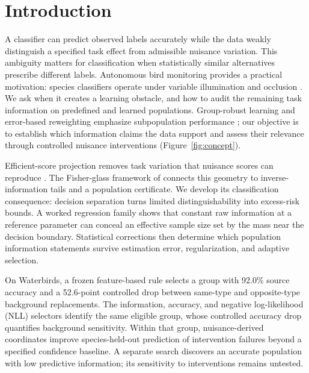 \section{Introduction}
\label{sec:introduction}

A classifier can predict observed labels accurately while the data weakly distinguish a specified task effect from admissible nuisance variation. This ambiguity matters for classification when statistically similar alternatives prescribe different labels. Autonomous bird monitoring provides a practical motivation: species classifiers operate under variable illumination and occlusion \citep{mansouri2025autonomous}. We ask when it creates a learning obstacle, and how to audit the remaining task information on predefined and learned populations. Group-robust learning and error-based reweighting emphasize subpopulation performance \citep{sagawa2019distributionally,liu2021just}; our objective is to establish which information claims the data support and assess their relevance through controlled nuisance interventions (Figure~\ref{fig:concept}).

Efficient-score projection removes task variation that nuisance scores can reproduce \citep{bickel1993efficient,tsiatis2006semiparametric}. The Fisher-glass framework of \mbox{\citet{mansouri_arai_2026_fisher_glasses}} connects this geometry to inverse-information tails and a population certificate. We develop its classification consequence: decision separation turns limited distinguishability into excess-risk bounds. A worked regression family shows that constant raw information at a reference parameter can conceal an effective sample size set by the mass near the decision boundary. Statistical corrections then determine which population information statements survive estimation error, regularization, and adaptive selection.

\begin{samepage}
On Waterbirds, a frozen feature-based rule selects a group with 92.0\% source accuracy and a 52.6-point controlled drop between same-type and opposite-type background replacements. The information, accuracy, and negative log-likelihood (NLL) selectors identify the same eligible group, whose controlled accuracy drop quantifies background sensitivity. Within that group, nuisance-derived coordinates improve species-held-out prediction of intervention failures beyond a specified confidence baseline. A separate search discovers an accurate population with low predictive information; its sensitivity to interventions remains untested.\par
\end{samepage}

